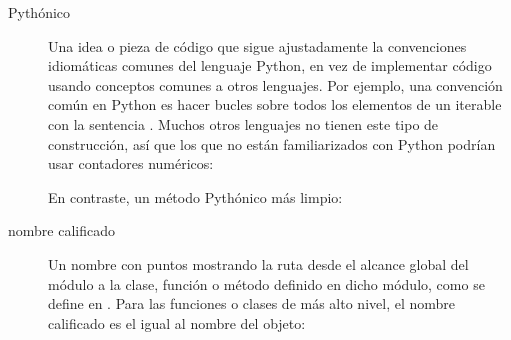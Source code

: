 \documentclass[a4,10pt,spanish]{sphinxmanual}
\begin{document}
\begin{description}
\item[{Pythónico\label{\detokenize{glossary:term-Pythonic}}}] \leavevmode
\sphinxAtStartPar
Una idea o pieza de código que sigue ajustadamente la convenciones idiomáticas comunes del lenguaje Python, en vez de implementar código usando conceptos comunes a otros lenguajes.  Por ejemplo, una convención común en Python es hacer bucles sobre todos los elementos de un iterable con la sentencia .  Muchos otros lenguajes no tienen este tipo de construcción, así que los que no están familiarizados con Python podrían usar contadores numéricos:

\begin{sphinxVerbatim}[commandchars=\\\{\}]
   
    \PYG{p}{[}\PYG{p}{]}
\end{sphinxVerbatim}

\sphinxAtStartPar
En contraste, un método Pythónico más limpio:

\begin{sphinxVerbatim}[commandchars=\\\{\}]
   
\end{sphinxVerbatim}

\item[{nombre calificado\label{\detokenize{glossary:term-qualified-name}}}] \leavevmode
\sphinxAtStartPar
Un nombre con puntos mostrando la ruta desde el alcance global del módulo a la clase, función o método definido en dicho módulo, como se define en .  Para las funciones o clases de más alto nivel, el nombre calificado es el igual al nombre del objeto:


\end{description}
\end{document}

